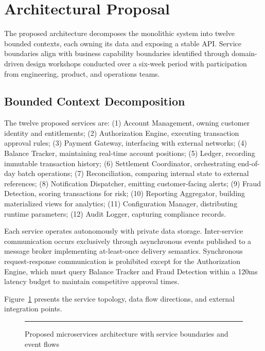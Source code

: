 \section{Architectural Proposal}

The proposed architecture decomposes the monolithic system into twelve bounded contexts, each owning its data and exposing a stable API. Service boundaries align with business capability boundaries identified through domain-driven design workshops conducted over a six-week period with participation from engineering, product, and operations teams.

\subsection{Bounded Context Decomposition}

The twelve proposed services are: (1) Account Management, owning customer identity and entitlements; (2) Authorization Engine, executing transaction approval rules; (3) Payment Gateway, interfacing with external networks; (4) Balance Tracker, maintaining real-time account positions; (5) Ledger, recording immutable transaction history; (6) Settlement Coordinator, orchestrating end-of-day batch operations; (7) Reconciliation, comparing internal state to external references; (8) Notification Dispatcher, emitting customer-facing alerts; (9) Fraud Detection, scoring transactions for risk; (10) Reporting Aggregator, building materialized views for analytics; (11) Configuration Manager, distributing runtime parameters; (12) Audit Logger, capturing compliance records.

Each service operates autonomously with private data storage. Inter-service communication occurs exclusively through asynchronous events published to a message broker implementing at-least-once delivery semantics. Synchronous request-response communication is prohibited except for the Authorization Engine, which must query Balance Tracker and Fraud Detection within a 120ms latency budget to maintain competitive approval times.

Figure~\ref{fig:microservices-architecture-overview} presents the service topology, data flow directions, and external integration points.

\begin{figure}[htbp]
\centering
\rule{0.8\textwidth}{0.45\textwidth}
\caption{Proposed microservices architecture with service boundaries and event flows}
\label{fig:microservices-architecture-overview}
\end{figure}

